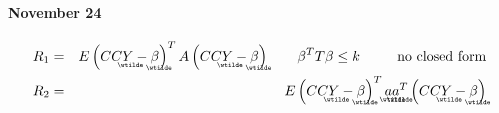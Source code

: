 \documentclass{article}
\begin{document}
\bigskip

\paragraph{November 24}

\begin{eqnarray*}
R_{1} &=&E\left( CC%
\underaccent{\wtilde}{Y}%
-%
\underaccent{\wtilde}{\beta}%
\right) ^{T}A\left( CC%
\underaccent{\wtilde}{Y}%
-%
\underaccent{\wtilde}{\beta}%
\right) \qquad \beta ^{T}T\beta \leq k\qquad \text{no closed form} \\
R_{2} &=&E\left( CC%
\underaccent{\wtilde}{Y}%
-%
\underaccent{\wtilde}{\beta}%
\right) ^{T}%
\underaccent{\wtilde}{a}%
\underaccent{\wtilde}{a}%
^{T}\left( CC%
\underaccent{\wtilde}{Y}%
-%
\underaccent{\wtilde}{\beta}%
\right)
\end{eqnarray*}
\end{document}
